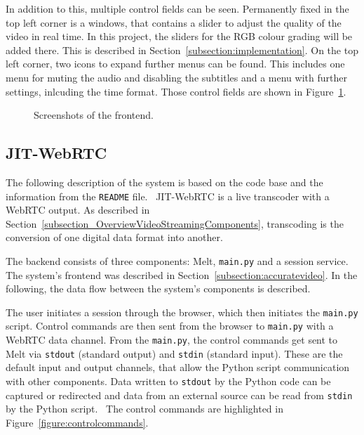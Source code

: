 \documentclass[../MasterThesis.tex]{subfiles}
\begin{document}
In addition to this, multiple control fields can be seen. Permanently fixed in the top left corner is a windows, that contains a slider to adjust the quality of the video in real time. In this project, the sliders for the RGB colour grading will be added there. This is described in Section~\ref{subsection:implementation}.
On the top left corner, two icons to expand further menus can be found. This includes one menu for muting the audio and disabling the subtitles and a menu with further settings, inlcuding the time format.
Those control fields are shown in Figure~\ref{figure:AV_details_before}.


\begin{figure}[H]
	\begin{center}
		\caption[Screenshots of the frontend.]{Screenshots of the frontend.}
		\label{figure:AV_details_before}
	\end{center}
\end{figure}







\subsection{JIT-WebRTC} \label{subsection:jit-webrtc}

The following description of the system is based on the code base and the information from the \texttt{README} file.~\cite{RM_Backend}
JIT-WebRTC is a live transcoder with a WebRTC output. As described in Section~\ref{subsection_OverviewVideoStreamingComponents}, transcoding is the conversion of one digital data format into another.~\cite{transcoding}



The backend consists of three components: Melt, \texttt{main.py} and a session service.
The system's frontend was described in Section~\ref{subsection:accuratevideo}.
In the following, the data flow between the system's components is described.

The user initiates a session through the browser, which then initiates the \texttt{main.py} script.
Control commands are then sent from the browser to \texttt{main.py} with a WebRTC data channel.
From the \texttt{main.py}, the control commands get sent to Melt via \texttt{stdout} (standard output) and \texttt{stdin} (standard input). These are the default input and output channels, that allow the Python script communication with other components.
Data written to \texttt{stdout} by the Python code can be captured or redirected and data from an external source can be read from \texttt{stdin} by the Python script.~\cite{python} The control commands are highlighted in Figure~\ref{figure:controlcommands}.
\end{document}
